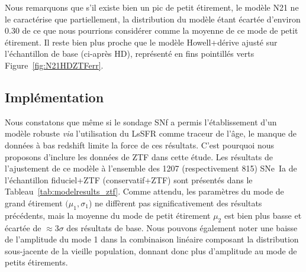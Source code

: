 \documentclass[../main/main.tex]{subfiles}
\begin{document}
Nous remarquons que s'il existe bien un pic de petit étirement, le modèle N21 ne
le caractérise que partiellement, la distribution du modèle étant écartée
d'environ \num{0.30} de ce que nous pourrions considérer comme la moyenne de ce
mode de petit étirement. Il reste bien plus proche que le modèle Howell+dérive
ajusté sur l'échantillon de base (ci-après HD), représenté en fins pointillés
verts Figure~\ref{fig:N21HDZTFerr}.

\subsection{Implémentation}\label{ssec:xamel}

Nous constatons que même si le sondage SNf a permis l'établissement d'un modèle
robuste \textit{via} l'utilisation du LsSFR comme traceur de l'âge, le manque de
données à bas redshift limite la force de ces résultats. C'est pourquoi nous
proposons d'inclure les données de ZTF dans cette étude. Les résultats de
l'ajustement de ce modèle à l'ensemble des 1207 (respectivement 815) SNe~Ia de
l'échantillon fiduciel+ZTF (conservatif+ZTF) sont présentés dans le
Tableau~\ref{tab:modelresults_ztf}. Comme attendu, les paramètres du mode de
grand étirement $(\mu_1,\sigma_1$) ne diffèrent pas significativement des
résultats précédents, mais la moyenne du mode de petit étirement $\mu_2$ est
bien plus basse et écartée de $\approx 3\sigma$ des résultats de base. Nous
pouvons également noter une baisse de l'amplitude du mode 1 dans la combinaison
linéaire composant la distribution sous-jacente de la vieille population,
donnant donc plus d'amplitude au mode de petits étirements.
\end{document}
